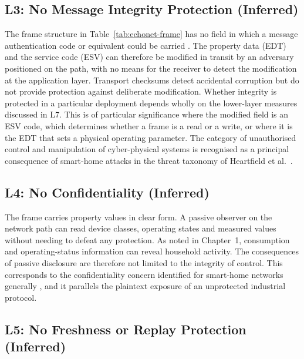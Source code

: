 \subsection{L3: No Message Integrity Protection (Inferred)}

The frame structure in Table~\ref{tab:echonet-frame} has no field in which a message authentication code or equivalent could be carried \cite{ECHONETPart2}. The property data (EDT) and the service code (ESV) can therefore be modified in transit by an adversary positioned on the path, with no means for the receiver to detect the modification at the application layer. Transport checksums detect accidental corruption but do not provide protection against deliberate modification. Whether integrity is protected in a particular deployment depends wholly on the lower-layer measures discussed in L7. This is of particular significance where the modified field is an ESV code, which determines whether a frame is a read or a write, or where it is the EDT that sets a physical operating parameter. The category of unauthorised control and manipulation of cyber-physical systems is recognised as a principal consequence of smart-home attacks in the threat taxonomy of Heartfield et al.\ \cite{heartfieldTaxonomyCyberphysicalThreats2018}.

\subsection{L4: No Confidentiality (Inferred)}

The frame carries property values in clear form. A passive observer on the network path can read device classes, operating states and measured values without needing to defeat any protection. As noted in Chapter~1, consumption and operating-status information can reveal household activity. The consequences of passive disclosure are therefore not limited to the integrity of control. This corresponds to the confidentiality concern identified for smart-home networks generally \cite{heartfieldTaxonomyCyberphysicalThreats2018}, and it parallels the plaintext exposure of an unprotected industrial protocol.

\subsection{L5: No Freshness or Replay Protection (Inferred)}

